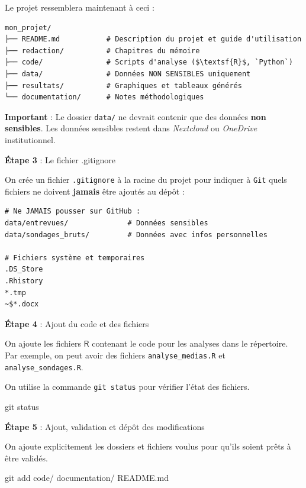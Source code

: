 \documentclass[
  letterpaper,
  DIV=11,
  numbers=noendperiod,
  oneside]{scrreprt}
\newenvironment{Shaded}{\begin{snugshade}}{\end{snugshade}}
\newcommand{\FunctionTok}[1]{\textcolor[rgb]{0.28,0.35,0.67}{#1}}
\newcommand{\NormalTok}[1]{\textcolor[rgb]{0.00,0.23,0.31}{#1}}
\begin{document}
Le projet ressemblera maintenant à ceci :

\begin{verbatim}
mon_projet/
├── README.md           # Description du projet et guide d'utilisation
├── redaction/          # Chapitres du mémoire
├── code/               # Scripts d'analyse ($\textsf{R}$, `Python`)
├── data/               # Données NON SENSIBLES uniquement
├── resultats/          # Graphiques et tableaux générés
└── documentation/      # Notes méthodologiques
\end{verbatim}

\textbf{Important} : Le dossier \texttt{data/} ne devrait contenir que
des données \textbf{non sensibles}. Les données sensibles restent dans
\emph{Nextcloud} ou \emph{OneDrive} institutionnel.

\textbf{Étape 3} : Le fichier .gitignore

On crée un fichier \texttt{.gitignore} à la racine du projet pour
indiquer à \texttt{Git} quels fichiers ne doivent \textbf{jamais} être
ajoutés au dépôt :

\begin{verbatim}
# Ne JAMAIS pousser sur GitHub :
data/entrevues/              # Données sensibles
data/sondages_bruts/         # Données avec infos personnelles

# Fichiers système et temporaires
.DS_Store
.Rhistory
*.tmp
~$*.docx
\end{verbatim}

\textbf{Étape 4} : Ajout du code et des fichiers

On ajoute les fichiers \(\textsf{R}\) contenant le code pour les
analyses dans le répertoire. Par exemple, on peut avoir des fichiers
\texttt{analyse\_medias.R} et \texttt{analyse\_sondages.R}.

On utilise la commande \texttt{git\ status} pour vérifier l'état des
fichiers.

\begin{Shaded}
\begin{Highlighting}[]
\FunctionTok{git}\NormalTok{ status}
\end{Highlighting}
\end{Shaded}

\textbf{Étape 5} : Ajout, validation et dépôt des modifications

On ajoute explicitement les dossiers et fichiers voulus pour qu'ils
soient prêts à être validés.

\begin{Shaded}
\begin{Highlighting}[]
\FunctionTok{git}\NormalTok{ add code/ documentation/ README.md}
\end{Highlighting}
\end{Shaded}
\end{document}
